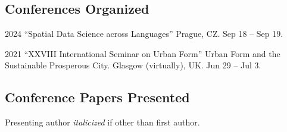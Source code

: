 \documentclass[12pt,a4paper]{report}
\begin{document}
    \subsection*{Conferences Organized}

    \begin{tablist}

        \item[2024] \tab{}\enquote{Spatial Data Science across Languages} Prague, CZ. Sep 18 -- Sep 19.
        \item[2021] \tab{}\enquote{XXVIII International Seminar on Urban Form} Urban Form and the Sustainable Prosperous City. Glasgow (virtually), UK. Jun 29 -- Jul 3.

    \end{tablist}

    \subsection*{Conference Papers Presented}

    Presenting author \textit{italicized} if other than first author.\bigskip
\end{document}

